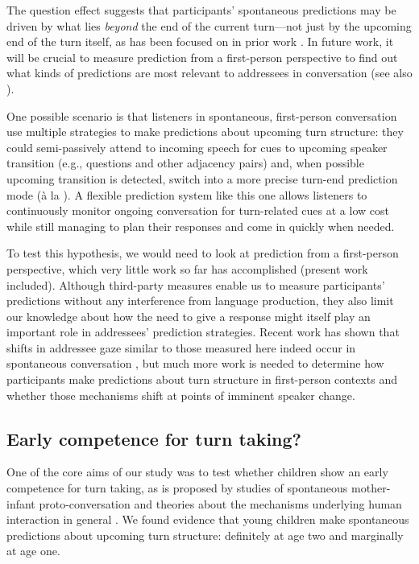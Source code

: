 \documentclass[authoryear, 12pt]{elsarticle}
\begin{document}
The question effect suggests that participants' spontaneous predictions may be driven by what lies \textit{beyond} the end of the current turn---not just by the upcoming end of the turn itself, as has been focused on in prior work \citep{torreira2015, keitel2013, magyari2012, de-ruiter2006}. In future work, it will be crucial to measure prediction from a first-person perspective to find out what kinds of predictions are most relevant to addressees in conversation (see also \citealp{holler2015}).

One possible scenario is that listeners in spontaneous, first-person conversation use multiple strategies to make predictions about upcoming turn structure: they could semi-passively attend to incoming speech for cues to upcoming speaker transition (e.g., questions and other adjacency pairs) and, when possible upcoming transition is detected, switch into a more precise turn-end prediction mode (\`{a} la \citealp{de-ruiter2006}). A flexible prediction system like this one allows listeners to continuously monitor ongoing conversation for turn-related cues at a low cost while still managing to plan their responses and come in quickly when needed.

To test this hypothesis, we would need to look at prediction from a first-person perspective, which very little work so far has accomplished (present work included). Although third-party measures enable us to measure participants' predictions without any interference from language production, they also limit our knowledge about how the need to give a response might itself play an important role in addressees' prediction strategies. Recent work has shown that shifts in addressee gaze similar to those measured here indeed occur in spontaneous conversation \citep{holler2015}, but much more work is needed to determine how participants make predictions about turn structure in first-person contexts and whether those mechanisms shift at points of imminent speaker change.

\subsection*{Early competence for turn taking?}

One of the core aims of our study was to test whether children show an early competence for turn taking, as is proposed by studies of spontaneous mother-infant proto-conversation and theories about the mechanisms underlying human interaction in general \citep{hilbrink2015, levinson2006}. We found evidence that young children make spontaneous predictions about upcoming turn structure: definitely at age two and marginally at age one.
\end{document}
